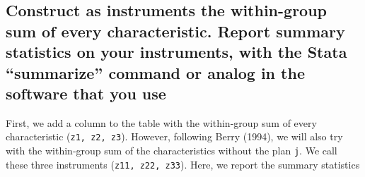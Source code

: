 \documentclass[]{article}
\begin{document}
\hypertarget{construct-as-instruments-the-within-group-sum-of-every-characteristic.-report-summary-statistics-on-your-instruments-with-the-stata-summarize-command-or-analog-in-the-software-that-you-use}{%
\subsection{Construct as instruments the within-group sum of every
characteristic. Report summary statistics on your instruments, with the
Stata ``summarize'' command or analog in the software that you
use}\label{construct-as-instruments-the-within-group-sum-of-every-characteristic.-report-summary-statistics-on-your-instruments-with-the-stata-summarize-command-or-analog-in-the-software-that-you-use}}

First, we add a column to the table with the within-group sum of every
characteristic (\texttt{z1,\ z2,\ z3}). However, following Berry (1994),
we will also try with the within-group sum of the characteristics
without the plan \texttt{j}. We call these three instruments
(\texttt{z11,\ z22,\ z33}). Here, we report the summary statistics
\end{document}
